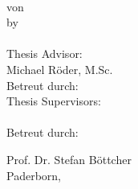 \begin{titlepage}
\begin{center}
		{\Huge\textbf{\thetitle{}}}\\[30pt]

		\ifgerman
			von\\
		\else
			by\\
		\fi 
		{\Large\textsc{\theauthor{}}}\\[50pt]
		
		Thesis Advisor:\\[8pt]
		
		{\large Michael Röder, M.Sc.}\\[30pt]

		\ifgerman
			Betreut durch:\\
		\else
			Thesis Supervisors:\\[8pt]
		\fi 
		{\large \thesupervisor{}}\\[5pt]
		
		\ifgerman
		Betreut durch:\\
		\else
	    
		\fi 
		{\large Prof. Dr. Stefan Böttcher}\\[30pt]

		Paderborn, \thesubmissiondate{}
	\end{center}
\end{titlepage}
